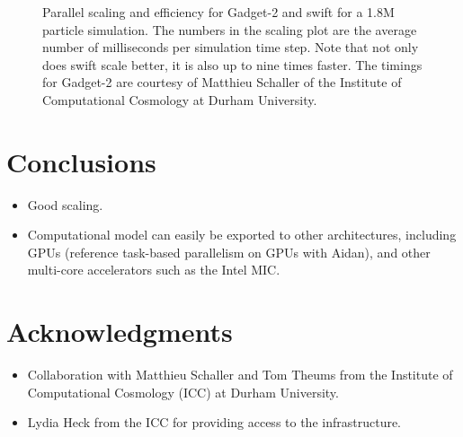 \documentclass[final]{siamltex}
\newcommand{\swift}
    {{\sc swift}\xspace}
\begin{document}
\begin{figure}[ht]
    \centerline{}
    
    \caption{Parallel scaling and efficiency for Gadget-2 and \swift
        for a 1.8M particle simulation.
        The numbers in the scaling plot are the average number of milliseconds
        per simulation time step.
        Note that not only does swift scale better, it is also up to nine
        times faster.
        The timings for Gadget-2 are courtesy of Matthieu Schaller of the
        Institute of Computational Cosmology at Durham University.}
    \label{fig:Results}
\end{figure}


\section{Conclusions}

\begin{itemize}

    \item Good scaling.
    
    \item Computational model can easily be exported to other architectures,
        including GPUs (reference task-based parallelism on GPUs with Aidan),
        and other multi-core accelerators such as the Intel MIC.
        
\end{itemize}


\section*{Acknowledgments}

\begin{itemize}

    \item Collaboration with Matthieu Schaller and Tom Theums from the
        Institute of Computational Cosmology (ICC) at Durham University.
        
    \item Lydia Heck from the ICC for providing access to the infrastructure.

\end{itemize}


\nopagebreak

\end{document}
